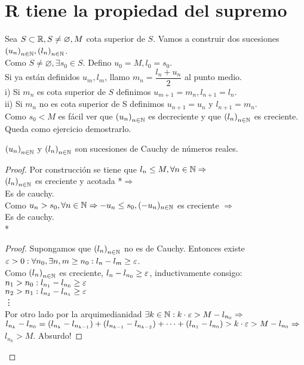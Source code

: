 \section{R tiene la propiedad del supremo}

Sea \(S \subset \mathbb{R}, S \neq \varnothing, M\) cota superior de \(S\). Vamos a construir dos sucesiones \({(u_n)}_{n \in \mathbb{N}}, {(l_n)}_{n \in \mathbb{N}} \). \\
Como \(S \neq \varnothing, \exists s_0 \in S\). Defino \(u_0 = M, l_0 = s_0\). \\
Si ya están definidos \(u_m, l_m\), llamo \(m_n = \dfrac{l_n+u_n}{2} \) al punto medio. \\
i) Si \(m_n\) es cota superior de \(S\) definimos \(u_{m+1} = m_n, l_{n+1} = l_n\). \\
ii) Si \(m_n\) no es cota superior de S definimos \(u_{n+1} = u_n\) y \(l_{n+1} = m_n\). \\
Como \(s_0 < M\) es fácil ver que \({(u_n)}_{n \in \mathbb{N}} \) es decreciente y que \({(l_n)}_{n \in \mathbb{N}} \) es creciente. Queda como ejercicio demostrarlo.

\begin{lemma}
  \({(u_n)}_{n \in \mathbb{N}} \) y \({(l_n)}_{n \in \mathbb{N}} \) son sucesiones de Cauchy de números reales.
  \begin{proof}
    Por construcción se tiene que \(l_n \leq M, \forall n \in \mathbb{N} \Rightarrow \) \\
    \({(l_n)}_{n \in \mathbb{N}} \) es creciente y acotada *\(\Rightarrow \) \\
    Es de cauchy. \\

    Como \(u_n > s_0, \forall n \in \mathbb{N} \Rightarrow -u_n \leq s_0, (-u_n)_{n \in \mathbb{N}} \) es creciente \(\Rightarrow \) \\
    Es de cauchy. \\

    * \begin{proof}
      Supongamos que \({(l_n)}_{n \in \mathbb{N}} \) no es de Cauchy. Entonces existe \(\varepsilon > 0 : \forall n_0, \exists n, m \geq n_0 : l_n - l_m \geq \varepsilon \). \\
      Como \({(l_n)}_{n \in \mathbb{N}} \) es creciente, \(l_n - l_{n_0} \geq \varepsilon \), inductivamente consigo: \\
      \(n_1 > n_0 : l_{n_1} - l_{n_0} \geq \varepsilon \) \\
      \(n_2 > n_1 : l_{n_2} - l_{n_1} \geq \varepsilon \) \\
      \vdots \\

      Por otro lado por la arquimedianidad \(\exists k \in \mathbb{N} : k \cdot \varepsilon > M - l_{n_0} \Rightarrow \) \\
      \(l_{n_k} - l_{n_0} = (l_{n_k} - l_{n_{k-1}}) + (l_{n_{k-1}} - l_{n_{k-2}}) + \cdots + (l_{n_1} - l_{n_0}) > k \cdot \varepsilon > M - l_{n_0} \Rightarrow \) \\
      \(l_{n_k} > M\). Absurdo!
    \end{proof}
  \end{proof}
\end{lemma}

